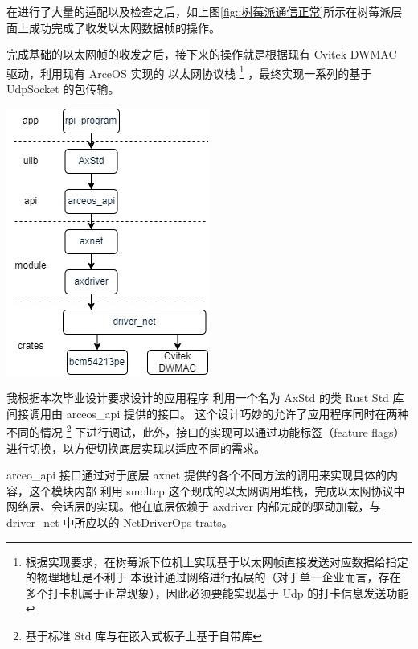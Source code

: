     在进行了大量的适配以及检查之后，如上图\ref{fig::树莓派通信正常}所示在树莓派层面上成功完成了收发以太网数据帧的操作。
            
    完成基础的以太网帧的收发之后，接下来的操作就是根据现有 Cvitek DWMAC 驱动，利用现有 ArceOS 实现的
    以太网协议栈
    \footnote{根据实现要求，在树莓派下位机上实现基于以太网帧直接发送对应数据给指定的物理地址是不利于
    本设计通过网络进行拓展的（对于单一企业而言，存在多个打卡机属于正常现象），因此必须要能实现基于 Udp 的打卡信息发送功能}
    ，最终实现一系列的基于 UdpSocket 的包传输。

    \noindent
    \begin{minipage}[t]{0.40\linewidth}
            \vspace{0pt}
            \centering
            \includegraphics[scale=0.6]{./imgs/ArceOS_网络调用.jpg}
                \label{fig::ArceOS网络调用}
        \end{minipage}           
        \quad
        \begin{minipage}[t]{0.55\linewidth}
            \vspace{0pt}
            \setlength{\parindent}{1em}

            我根据本次毕业设计要求设计的应用程序
            利用一个名为 AxStd 的类 Rust Std 库间接调用由 arceos\_api 提供的接口。
            这个设计巧妙的允许了应用程序同时在两种不同的情况
            \footnote{基于标准 Std 库与在嵌入式板子上基于自带库}
            下进行调试，此外，接口的实现可以通过功能标签（feature flags）进行切换，以方便切换底层实现以适应不同的需求。

            arceo\_api 接口通过对于底层 axnet 提供的各个不同方法的调用来实现具体的内容，这个模块内部
            利用 smoltcp 这个现成的以太网调用堆栈，完成以太网协议中网络层、会话层的实现。他在底层依赖于
            axdriver 内部完成的驱动加载，与 driver\_net 中所应以的 NetDriverOps traits。           

        \end{minipage}

